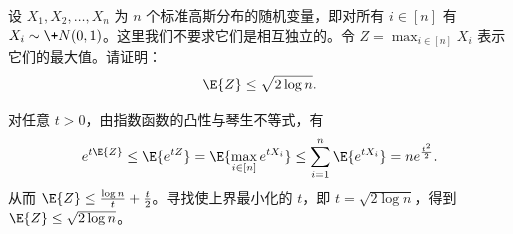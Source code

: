 \begin{exercise}
设 $X_1, X_2, \dots, X_n$ 为 $n$ 个标准高斯分布的随机变量，即对所有 $i \in [n]$ 有 $X_i \sim \+N(0, 1)$。这里我们不要求它们是相互独立的。令 $Z = \max_{i \in [n]} X_i$ 表示它们的最大值。请证明：
\[
    \E{Z} \le \sqrt{2 \log n}.
\]
\end{exercise}
\begin{solution}
    对任意 $t > 0$，由指数函数的凸性与琴生不等式，有
    \[
        e^{t\E{Z}} \le \E{e^{tZ}} = \E{\max_{i\in[n]} e^{t X_i}} \le \sum_{i=1}^n \E{e^{t X_i}} = n e^{\frac{t^2}{2}}.
    \]
    从而 $\E{Z} \le \frac{\log n}{t} + \frac{t}{2}$。寻找使上界最小化的 $t$，即 $t = \sqrt{2\log n}$，得到 $\E{Z} \le \sqrt{2\log n}$。
\end{solution}


